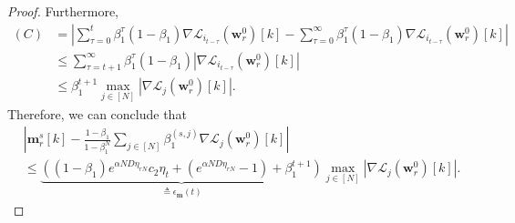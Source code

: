 \documentclass{article} %
\theoremstyle{plain}
\theoremstyle{definition}
\theoremstyle{remark}
\def\bigabs#1{\left|#1\right|}
\def\bigopen#1{\left(#1\right)}
\newcommand{\Ls}{\mathcal{L}}
\def\bm{{\mathbf m}}
\def\bw{{\mathbf w}}
\begin{document}
\begin{proof}
    Furthermore,
    \begin{align*}
        (C) &= \bigabs{\sum_{\tau=0}^{t}\beta_1^\tau(1-\beta_1)\nabla \Ls_{i_{t-\tau}}(\bw_r^0)[k] - \sum_{\tau=0}^\infty\beta_1^\tau(1-\beta_1)\nabla\Ls_{i_{t-\tau}}(\bw_r^0)[k]} \\
        &\leq \sum_{\tau=t+1}^\infty\beta_1^\tau(1-\beta_1) \bigabs{\nabla \Ls_{i_{t-\tau}}(\bw_r^0)[k]} \\
        & \leq \beta_1^{t+1}\max_{j \in [N]}|\nabla \Ls_j(\bw_r^0)[k]|.
    \end{align*}
    Therefore, we can conclude that
    \begin{align*}
        &|\bm_r^s[k]-\frac{1-\beta_1}{1-\beta_1^N}\sum_{j \in [N]}\beta_1^{(s, j)}\nabla\Ls_{j}(\bw_r^0)[k]| \\
        &\leq \underbrace{\bigopen{(1-\beta_1)e^{\alpha ND \eta_{rN}}c_2\eta_t+(e^{\alpha ND \eta_{rN}}-1)+\beta_1^{t+1}}}_{\triangleq \epsilon_\bm(t)}\max_{j \in [N]}|\nabla \Ls_j(\bw_r^0)[k]|.
    \end{align*}
    

\end{proof}
\end{document}
